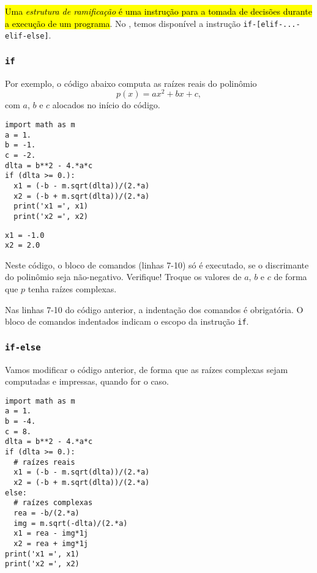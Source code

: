 \documentclass[12pt]{article}
\begin{document}
\hl{Uma \emph{estrutura de ramificação} é uma instrução para a tomada de decisões durante a execução de um programa}. No {\python}, temos disponível a instrução \texttt{if-[elif-...-elif-else]}.

\subsubsection{\texttt{if}}

Por exemplo, o código abaixo computa as raízes reais do polinômio
\begin{equation}
  p(x) = ax^2 + bx + c,
\end{equation}  
com $a$, $b$ e $c$ alocados no início do código.

\begin{lstlisting}
import math as m
a = 1.
b = -1.
c = -2.
dlta = b**2 - 4.*a*c
if (dlta >= 0.):
  x1 = (-b - m.sqrt(dlta))/(2.*a)
  x2 = (-b + m.sqrt(dlta))/(2.*a)
  print('x1 =', x1)
  print('x2 =', x2)
\end{lstlisting}

\begin{verbatim}
x1 = -1.0
x2 = 2.0
\end{verbatim}

Neste código, o bloco de comandos (linhas 7-10) só é executado, se o discrimante do polinômio seja não-negativo. Verifique! Troque os valores de $a$, $b$ e $c$ de forma que $p$ tenha raízes complexas.

\begin{obs}
  Nas linhas 7-10 do código anterior, a indentação dos comandos é obrigatória. O bloco de comandos indentados indicam o escopo da instrução \texttt{if}.
\end{obs}

\subsubsection{\texttt{if-else}}

Vamos modificar o código anterior, de forma que as raízes complexas sejam computadas e impressas, quando for o caso.

\begin{lstlisting}
import math as m
a = 1.
b = -4.
c = 8.
dlta = b**2 - 4.*a*c
if (dlta >= 0.):
  # raízes reais
  x1 = (-b - m.sqrt(dlta))/(2.*a)
  x2 = (-b + m.sqrt(dlta))/(2.*a)
else:
  # raízes complexas
  rea = -b/(2.*a)
  img = m.sqrt(-dlta)/(2.*a)
  x1 = rea - img*1j
  x2 = rea + img*1j
print('x1 =', x1)
print('x2 =', x2)
\end{lstlisting}
\end{document}
